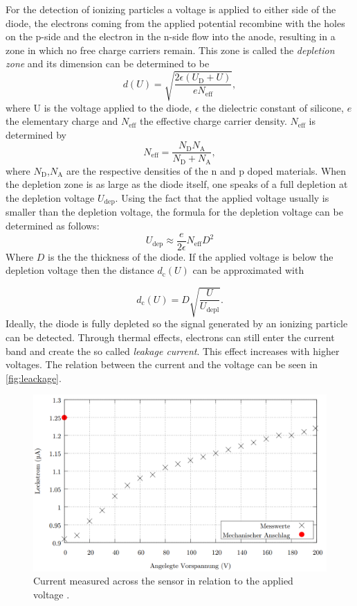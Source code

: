 For the detection of ionizing particles a voltage is applied to either side of the diode, the electrons coming from the applied potential recombine with the holes on the p-side and the electron in the n-side flow into the anode, resulting in a zone in which no free charge carriers remain. This zone is called the \textit{depletion zone} and its dimension can be determined to be
\begin{equation}
	d(U) = \sqrt{\frac{2\epsilon(U_\mathrm{D}+ U)}{eN_\mathrm{eff}}},
	\label{depl}
\end{equation}
where U is the voltage applied to the diode, $\epsilon$ the dielectric constant of silicone, $e$ the elementary charge and $N_\mathrm{eff}$ the effective charge carrier density. $N_\mathrm{eff}$ is determined by 
\begin{equation*}
	N_\mathrm{eff} = \frac{N_\mathrm{D}N_\mathrm{A}}{N_\mathrm{D}+N_\mathrm{A}},
\end{equation*}
where $N_\mathrm{D}$,$N_\mathrm{A}$ are the respective densities of the n and p doped materials. When the depletion zone is as large as the diode itself, one speaks of a full depletion at the depletion voltage $U_\mathrm{dep}$. Using the fact that the applied voltage usually is smaller than the depletion voltage, the formula for the depletion voltage can be determined as follows:
\begin{equation*}
	U_\mathrm{dep} \approx \frac{e}{2\epsilon} N_\mathrm{eff} D^2
\end{equation*}
Where $D$ is the the thickness of the diode. If the applied voltage is below the depletion voltage then the distance $d_\mathrm{c}(U)$ can be approximated with

\begin{equation*}
	d_\mathrm{c}(U)= D\sqrt{\frac{U}{U_\mathrm{depl}}}.
\end{equation*}
Ideally, the diode is fully depleted so the signal generated by an ionizing particle can be detected. Through thermal effects, electrons can still enter the current band and create the so called \textit{leakage current}. This effect increases with higher voltages. The relation between the current and the voltage can be seen in \autoref{fig:leackage}.

\begin{figure}[H]
	\centering
	\includegraphics[width=0.7\linewidth]{Assets/leackage}
	\caption{Current measured across the sensor in relation to the applied voltage \cite{V15}.}
	\label{fig:leackage}
\end{figure}


